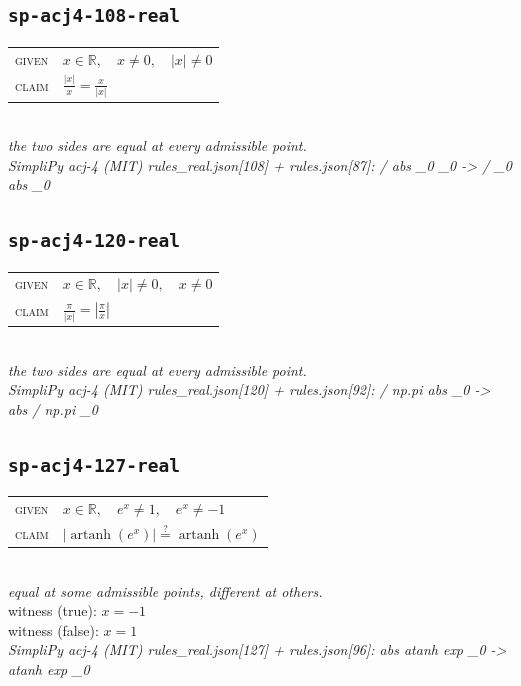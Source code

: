 \documentclass[11pt]{article}
\begin{document}
\subsection*{\texttt{sp-acj4-108-real}}
\begin{tabular}{@{}l@{\quad}l@{}}
\textsc{given} & $x \in \mathbb{R},\quad x \neq 0,\quad \left|x\right| \neq 0$ \\[4pt]
\textsc{claim} & $\displaystyle \frac{\left|x\right|}{x} = \frac{x}{\left|x\right|}$ \\
\end{tabular}\\[2pt]
{\small\emph{the two sides are equal at every admissible point.}}\\
\emph{SimpliPy acj-4 (MIT) rules\_real.json[108] + rules.json[87]: / abs \_0 \_0  ->  / \_0 abs \_0}\\

\subsection*{\texttt{sp-acj4-120-real}}
\begin{tabular}{@{}l@{\quad}l@{}}
\textsc{given} & $x \in \mathbb{R},\quad \left|x\right| \neq 0,\quad x \neq 0$ \\[4pt]
\textsc{claim} & $\displaystyle \frac{\pi}{\left|x\right|} = \left|\frac{\pi}{x}\right|$ \\
\end{tabular}\\[2pt]
{\small\emph{the two sides are equal at every admissible point.}}\\
\emph{SimpliPy acj-4 (MIT) rules\_real.json[120] + rules.json[92]: / np.pi abs \_0  ->  abs / np.pi \_0}\\

\subsection*{\texttt{sp-acj4-127-real}}
\begin{tabular}{@{}l@{\quad}l@{}}
\textsc{given} & $x \in \mathbb{R},\quad e^{x} \neq 1,\quad e^{x} \neq -1$ \\[4pt]
\textsc{claim} & $\displaystyle \left|\operatorname{artanh}\left(e^{x}\right)\right| \overset{?}{=} \operatorname{artanh}\left(e^{x}\right)$ \\
\end{tabular}\\[2pt]
{\small\emph{equal at some admissible points, different at others.}}\\
{\footnotesize\color{gray}witness (true): $x = -1$}\\
{\footnotesize\color{gray}witness (false): $x = 1$}\\
\emph{SimpliPy acj-4 (MIT) rules\_real.json[127] + rules.json[96]: abs atanh exp \_0  ->  atanh exp \_0}\\
\end{document}
